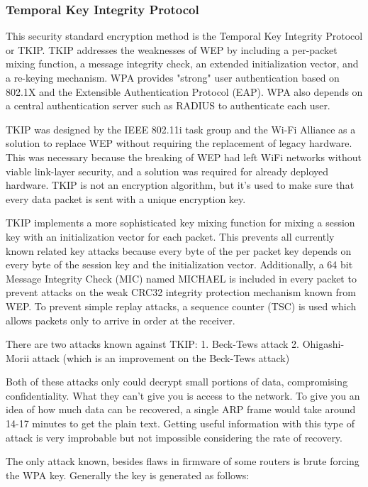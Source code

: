 \documentclass[a4paper,12pt,pagesize,headsepline,bibtotoc,titlepage]{scrartcl}
\begin{document}
\subsubsection{Temporal Key Integrity Protocol}

This security standard encryption method is the Temporal Key Integrity Protocol or TKIP. TKIP addresses the weaknesses of WEP by including a per-packet mixing function, a message integrity check, an extended initialization vector, and a re-keying mechanism. WPA provides "strong" user authentication based on 802.1X and the Extensible Authentication Protocol (EAP). WPA also depends on a central authentication server such as RADIUS to authenticate each user.

TKIP was designed by the IEEE 802.11i task group and the Wi-Fi Alliance as a solution to replace WEP without requiring the replacement of legacy hardware. This was necessary because the breaking of WEP had left WiFi networks without viable link-layer security, and a solution was required for already deployed hardware. TKIP is not an encryption algorithm, but it’s used to make sure that every data packet is sent with a unique encryption key.

TKIP implements a more sophisticated key mixing function for mixing a session key with an initialization vector for each packet. This prevents all currently known related key attacks because every byte of the per packet key depends on every byte of the session key and the initialization vector. Additionally, a 64 bit Message Integrity Check (MIC) named MICHAEL is included in every packet to prevent attacks on the weak CRC32 integrity protection mechanism known from WEP. To prevent simple replay attacks, a sequence counter (TSC) is used which allows packets only to arrive in order at the receiver.

There are two attacks known against TKIP:
1. Beck-Tews attack
2. Ohigashi-Morii attack (which is an improvement on the Beck-Tews attack)

Both of these attacks only could decrypt small portions of data, compromising confidentiality. What they can’t give you is access to the network. To give you an idea of how much data can be recovered, a single ARP frame would take around 14-17 minutes to get the plain text. Getting useful information with this type of attack is very improbable but not impossible considering the rate of recovery.

The only attack known, besides flaws in firmware of some routers is brute forcing the WPA key. Generally the key is generated as follows:
\end{document}
